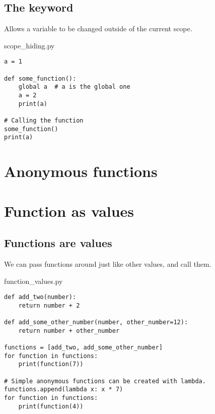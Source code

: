 \documentclass[aspectratio=1610,slidestop]{beamer}
\begin{document}
\subsection{The  keyword}
\begin{pframe}
 Allows a variable to be changed outside of the current scope.
 \pause
 \medskip

 \begin{minipage}[t]{0.60\textwidth}
  \begin{pythonfile}{scope\_hiding.py}
   \begin{verbatim}
a = 1

def some_function():
    global a  # a is the global one
    a = 2
    print(a)

# Calling the function
some_function()
print(a)
   \end{verbatim}
  \end{pythonfile}
 \end{minipage}\qquad
 \pause
 \begin{minipage}[t]{0.35\textwidth}
 \vspace{-4.55cm}
 \begin{terminal}
  \end{terminal}
 \end{minipage}
\end{pframe}



\section{Anonymous functions}


\section{Function as values}

\subsection{Functions are values}
\begin{pframe}
 We can pass functions around just like other values, and call them.
 \begin{pythonfile}{function\_values.py}
  \begin{verbatim}
def add_two(number):
    return number + 2

def add_some_other_number(number, other_number=12):
    return number + other_number

functions = [add_two, add_some_other_number]
for function in functions:
    print(function(7))

# Simple anonymous functions can be created with lambda.
functions.append(lambda x: x * 7)
for function in functions:
    print(function(4))
  \end{verbatim}
 \end{pythonfile}
\end{pframe}
\end{document}
